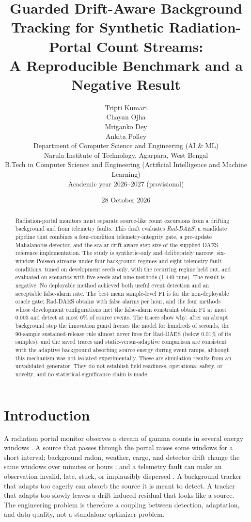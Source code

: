 \documentclass[11pt]{article}
\title{Guarded Drift-Aware Background Tracking for Synthetic Radiation-Portal Count Streams:\\A Reproducible Benchmark and a Negative Result}
\author{%
  Tripti Kumari\\
  Chayan Ojha\\
  Mriganko Dey\\
  Ankita Polley\\[0.8em]
  \small Department of Computer Science and Engineering (AI \& ML)\\
  \small Narula Institute of Technology, Agarpara, West Bengal\\
  \small B.Tech in Computer Science and Engineering (Artificial Intelligence and Machine Learning)\\
  \small Academic year 2026--2027 (provisional)
}
\date{28 October 2026}
\begin{document}
\maketitle

\begin{abstract}
Radiation-portal monitors must separate source-like count excursions from a drifting background and from telemetry faults. This draft evaluates \emph{Rad-DAES}, a candidate pipeline that combines a four-condition telemetry-integrity gate, a pre-update Mahalanobis detector, and the scalar drift-aware step size of the supplied DAES reference implementation. The study is synthetic-only and deliberately narrow: six-window Poisson streams under four background regimes and eight telemetry-fault conditions, tuned on development seeds only, with the recurring regime held out, and evaluated on \NScenarios{} scenarios with five seeds and nine methods (1{,}440 runs). The result is negative. No deployable method achieved both useful event detection and an acceptable false-alarm rate. The best mean sample-level F1 is \BestValue{} for the non-deployable oracle gate; Rad-DAES obtains \RadDAESFone{} with \RadDAESFarPerHour{} false alarms per hour, and the four methods whose development configurations met the false-alarm constraint obtain F1 at most $0.003$ and detect at most 6\% of source events. The traces show why: after an abrupt background step the innovation guard freezes the model for hundreds of seconds, the 90-sample sustained-release rule almost never fires for Rad-DAES (below 0.01\% of its samples), and the saved traces and static-versus-adaptive comparison are consistent with the adaptive background absorbing source energy during event ramps, although this mechanism was not isolated experimentally. These are simulation results from an unvalidated generator. They do not establish field readiness, operational safety, or novelty, and no statistical-significance claim is made.
\end{abstract}

\section{Introduction}

A radiation portal monitor observes a stream of gamma counts in several energy windows \citep{knoll2010radiation,runkle2009photon}. A source that passes through the portal raises some windows for a short interval; background radon, weather, cargo, and detector drift change the same windows over minutes or hours \citep{sim2021background,sim2024cargo}; and a telemetry fault can make an observation invalid, late, stuck, or implausibly dispersed \citep{isermann2005model,little2019missing}. A background tracker that adapts too eagerly can absorb the source it is meant to detect. A tracker that adapts too slowly leaves a drift-induced residual that looks like a source. The engineering problem is therefore a coupling between detection, adaptation, and data quality, not a standalone optimizer problem.
\end{document}

